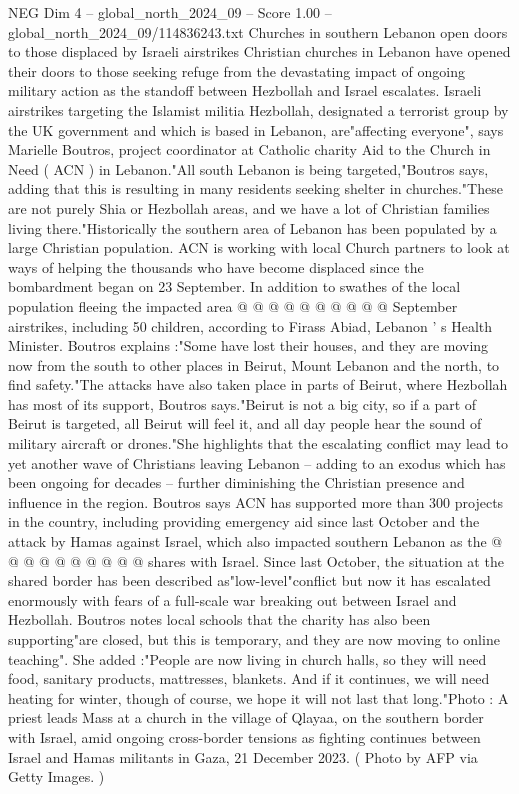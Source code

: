 \begin{textsample}{NEG Dim 4 – global\_north\_2024\_09 – Score 1.00 – global\_north\_2024\_09/114836243.txt}  \label{ex:f4_neg_136}
Churches in southern Lebanon open doors to those displaced by Israeli airstrikes Christian churches in Lebanon have opened their doors to those seeking refuge from the devastating impact of ongoing military action as the standoff between Hezbollah and Israel escalates.
Israeli airstrikes targeting the Islamist militia Hezbollah, designated a terrorist group by the UK government and which is based in Lebanon, are"affecting everyone", says Marielle Boutros, project coordinator at Catholic charity Aid to the Church in Need ( ACN ) in Lebanon."All south Lebanon is being targeted,"Boutros says, adding that this is resulting in many residents seeking shelter in churches."These are not purely Shia or Hezbollah areas, and we have a lot of Christian families living there."Historically the southern area of Lebanon has been populated by a large Christian population.
ACN is working with local Church partners to look at ways of helping the thousands who have become displaced since the bombardment began on 23 September.
In addition to swathes of the local population fleeing the impacted area @ @ @ @ @ @ @ @ @ @ September airstrikes, including 50 children, according to Firass Abiad, Lebanon ' s Health Minister.
Boutros explains :"Some have lost their houses, and they are moving now from the south to other places in Beirut, Mount Lebanon and the north, to find safety."The attacks have also taken place in parts of Beirut, where Hezbollah has most of its support, Boutros says."Beirut is not a big city, so if a part of Beirut is targeted, all Beirut will feel it, and all day people hear the sound of military aircraft or drones."She highlights that the escalating conflict may lead to yet another wave of Christians leaving Lebanon -- adding to an exodus which has been ongoing for decades -- further diminishing the Christian presence and influence in the region.
Boutros says ACN has supported more than 300 projects in the country, including providing emergency aid since last October and the attack by Hamas against Israel, which also impacted southern Lebanon as the @ @ @ @ @ @ @ @ @ @ shares with Israel.
Since last October, the situation at the shared border has been described as"low-level"conflict but now it has escalated enormously with fears of a full-scale war breaking out between Israel and Hezbollah.
Boutros notes local schools that the charity has also been supporting"are closed, but this is temporary, and they are now moving to online teaching".
She added :"People are now living in church halls, so they will need food, sanitary products, mattresses, blankets.
And if it continues, we will need heating for winter, though of course, we hope it will not last that long."Photo : A priest leads Mass at a church in the village of Qlayaa, on the southern border with Israel, amid ongoing cross-border tensions as fighting continues between Israel and Hamas militants in Gaza, 21 December 2023. ( Photo by AFP via Getty Images. )

\end{textsample}
